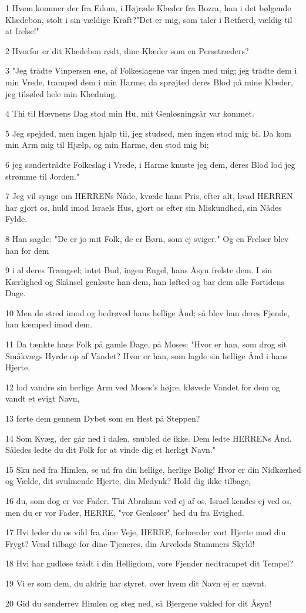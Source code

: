 \par 1 Hvem kommer der fra Edom, i Højrøde Klæder fra Bozra, han i det bølgende Klædebon, stolt i sin vældige Kraft?"Det er mig, som taler i Retfærd, vældig til at frelse!"
\par 2 Hvorfor er dit Klædebon rødt, dine Klæder som en Persetræders?
\par 3 "Jeg trådte Vinpersen ene, af Folkeslagene var ingen med mig; jeg trådte dem i min Vrede, tramped dem i min Harme; da sprøjted deres Blod på mine Klæder, jeg tilsøled hele min Klædning.
\par 4 Thi til Hævnens Dag stod min Hu, mit Genløsningsår var kommet.
\par 5 Jeg spejded, men ingen hjalp til, jeg studsed, men ingen stod mig bi. Da kom min Arm mig til Hjælp, og min Harme, den stod mig bi;
\par 6 jeg søndertrådte Folkeslag i Vrede, i Harme knuste jeg dem, deres Blod lod jeg strømme til Jorden."
\par 7 Jeg vil synge om HERRENs Nåde, kvæde hans Pris, efter alt, hvad HERREN har gjort os, huld imod Israels Hus, gjort os efter sin Miskundhed, sin Nådes Fylde.
\par 8 Han sagde: "De er jo mit Folk, de er Børn, som ej sviger." Og en Frelser blev han for dem
\par 9 i al deres Trængsel; intet Bud, ingen Engel, hans Åsyn frelste dem. I sin Kærlighed og Skånsel genløste han dem, han løfted og bar dem alle Fortidens Dage.
\par 10 Men de stred imod og bedrøved hans hellige Ånd; så blev han deres Fjende, han kæmped imod dem.
\par 11 Da tænkte hans Folk på gamle Dage, på Moses: "Hvor er han, som drog sit Småkvægs Hyrde op af Vandet? Hvor er han, som lagde sin hellige Ånd i hans Hjerte,
\par 12 lod vandre sin herlige Arm ved Moses's højre, kløvede Vandet for dem og vandt et evigt Navn,
\par 13 førte dem gennem Dybet som en Hest på Steppen?
\par 14 Som Kvæg, der går ned i dalen, snubled de ikke. Dem ledte HERRENs Ånd. Således ledte du dit Folk for at vinde dig et herligt Navn."
\par 15 Sku ned fra Himlen, se ud fra din hellige, herlige Bolig! Hvor er din Nidkærhed og Vælde, dit svulmende Hjerte, din Medynk? Hold dig ikke tilbage,
\par 16 du, som dog er vor Fader. Thi Abraham ved ej af os, Israel kendes ej ved os, men du er vor Fader, HERRE, "vor Genløser" hed du fra Evighed.
\par 17 Hvi leder du os vild fra dine Veje, HERRE, forhærder vort Hjerte mod din Frygt? Vend tilbage for dine Tjeneres, din Arvelods Stammers Skyld!
\par 18 Hvi har gudløse trådt i din Helligdom, vore Fjender nedtrampet dit Tempel?
\par 19 Vi er som dem, du aldrig har styret, over hvem dit Navn ej er nævnt.
\par 20 Gid du sønderrev Himlen og steg ned, så Bjergene vakled for dit Åsyn!

